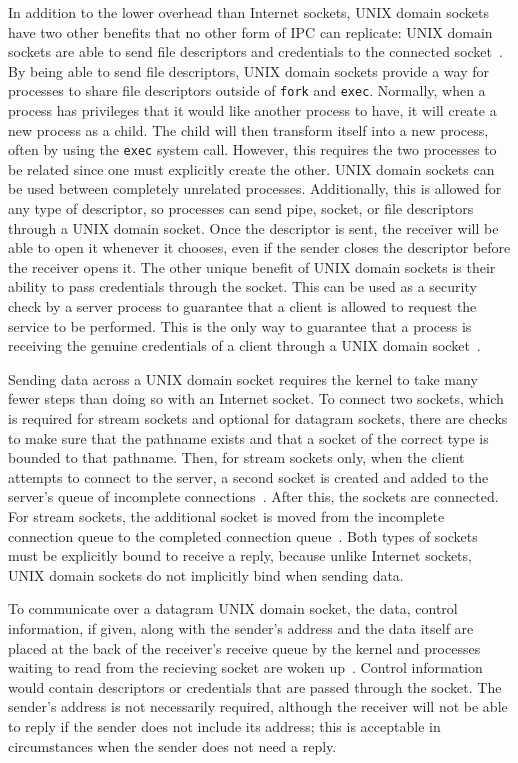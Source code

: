 In addition to the lower overhead than Internet sockets, UNIX domain sockets have two other benefits that no other form of IPC can replicate: UNIX domain sockets are able to send file descriptors and credentials to the connected socket~\cite[p 381--394]{Stevens:1997:UNP:522800}.  By being able to send file descriptors, UNIX domain sockets provide a way for processes to share file descriptors outside of \texttt{fork} and \texttt{exec}.  Normally, when a process has privileges that it would like another process to have, it will create a new process as a child.  The child will then transform itself into a new process, often by using the \texttt{exec} system call.  However, this requires the two processes to be related since one must explicitly create the other.  UNIX domain sockets can be used between completely unrelated processes.  Additionally, this is allowed for any type of descriptor, so processes can send pipe, socket, or file descriptors through a UNIX domain socket.  Once the descriptor is sent, the receiver will be able to open it whenever it chooses, even if the sender closes the descriptor before the receiver opens it.  The other unique benefit of UNIX domain sockets is their ability to pass credentials through the socket.  This can be used as a security check by a server process to guarantee that a client is allowed to request the service to be performed.  This is the only way to guarantee that a process is receiving the genuine credentials of a client through a UNIX domain socket~\cite[p 391]{Stevens:1997:UNP:522800}.

Sending data across a UNIX domain socket requires the kernel to take many fewer steps than doing so with an Internet socket.  To connect two sockets, which is required for stream sockets and optional for datagram sockets, there are checks to make sure that the pathname exists and that a socket of the correct type is bounded to that pathname.  Then, for stream sockets only, when the client attempts to connect to the server, a second socket is created and added to the server's queue of incomplete connections~\cite[p 240--245]{Stevens:1996:TIT:233130}.  After this, the sockets are connected.  For stream sockets, the additional socket is moved from the incomplete connection queue to the completed connection queue~\cite[p 245--249]{Stevens:1996:TIT:233130}.  Both types of sockets must be explicitly bound to receive a reply, because unlike Internet sockets, UNIX domain sockets do not implicitly bind when sending data.

To communicate over a datagram UNIX domain socket, the data, control information, if given, along with the sender's address and the data itself are placed at the back of the receiver's receive queue by the kernel and processes waiting to read from the recieving socket are woken up~\cite[p 263--265]{Stevens:1996:TIT:233130}.  Control information would contain descriptors or credentials that are passed through the socket.  The sender's address is not necessarily required, although the receiver will not be able to reply if the sender does not include its address; this is acceptable in circumstances when the sender does not need a reply.

